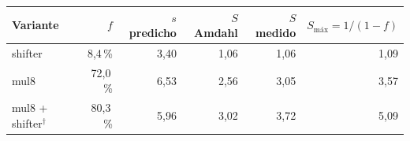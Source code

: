 \begin{tabular}{lrrrrr}
\toprule
Variante & $f$ & $s$ predicho & $S$ Amdahl & $S$ medido & $S_\text{máx}=1/(1-f)$ \\
\midrule
shifter & 8,4\,\% & 3,40 & 1,06 & 1,06 & 1,09 \\
mul8 & 72,0\,\% & 6,53 & 2,56 & 3,05 & 3,57 \\
mul8 + shifter$^\dagger$ & 80,3\,\% & 5,96 & 3,02 & 3,72 & 5,09 \\
\bottomrule
\end{tabular}
